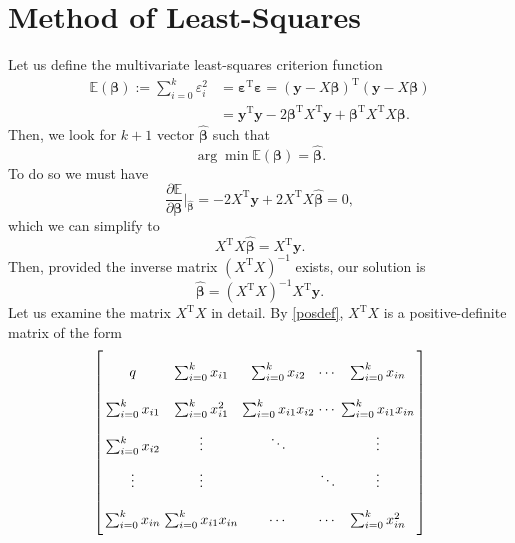 \documentclass[10pt,a4paper, onecolumn, conference]{IEEEtran}
\theoremstyle{own}
\theoremstyle{definition}
\theoremstyle{plain}
\begin{document}
\section{Method of Least-Squares}
Let us define the multivariate least-squares criterion function
\begin{align} \nonumber
\mathbb{E}(\boldsymbol\beta) := \sum_{i = 0}^k \varepsilon_i^2 & = \boldsymbol\varepsilon^{\text{T}} \boldsymbol\varepsilon = (\mathbf{y} - X \boldsymbol\beta)^{\text{T}} (\mathbf{y} - X \boldsymbol\beta) \\
& = \mathbf{y}^{\text{T}}\mathbf{y} - 2\boldsymbol\beta^{\text{T}}X^{\text{T}}\mathbf{y} + \boldsymbol\beta^{\text{T}}X^{\text{T}} X\boldsymbol\beta.
\end{align}
Then, we look for $k+1$ vector $\hat{\boldsymbol\beta}$ such that
\begin{equation}
\arg \min \mathbb{E} (\boldsymbol\beta) = \hat{\boldsymbol\beta}.
\end{equation}
To do so we must have
\begin{equation}
\frac{\partial \mathbb{E}}{\partial \boldsymbol\beta} \Big|_{\hat{\boldsymbol\beta}} = -2X^{\text{T}}\mathbf{y} + 2 X^{\text{T}} X \hat{\boldsymbol\beta} =  0,
\end{equation}
which we can simplify to
\begin{equation}
X^{\text{T}} X \hat{\boldsymbol\beta} = X^{\text{T}}\mathbf{y}.
\end{equation}
Then, provided the inverse matrix $(X^{\text{T}} X)^{-1}$ exists, our solution is
\begin{equation}
\hat{\boldsymbol\beta} = (X^{\text{T}} X)^{-1} X^{\text{T}}\mathbf{y}.
\end{equation}
Let us examine the matrix $X^{\text{T}} X$ in detail. By \cref{posdef}, $X^{\text{T}} X$ is a positive-definite matrix of the form
\begin{equation*} \arraycolsep=1.4pt\def\arraystretch{2.2}
\left[ \begin{array}{ccccc} q & \sum_{i = 0}^k x_{i1} & \sum_{i = 0}^k x_{i2} & \cdots & \sum_{i = 0}^k x_{in} \\
             \sum_{i = 0}^k x_{i1} & \sum_{i = 0}^k x_{i1}^2 & \sum_{i = 0}^k x_{i1}x_{i2} & \cdots & \sum_{i = 0}^k x_{i1}x_{in} \\
             \sum_{i = 0}^k x_{i2} & \vdots & \ddots & & \vdots\\
             \vdots				   & \vdots &  & \ddots & \vdots \\
             \sum_{i = 0}^k x_{in} & \sum_{i = 0}^k x_{i1}x_{in}  & \cdots & \cdots & \sum_{i = 0}^k x_{in}^2

\end{array} \right]
\end{equation*}
\end{document}
